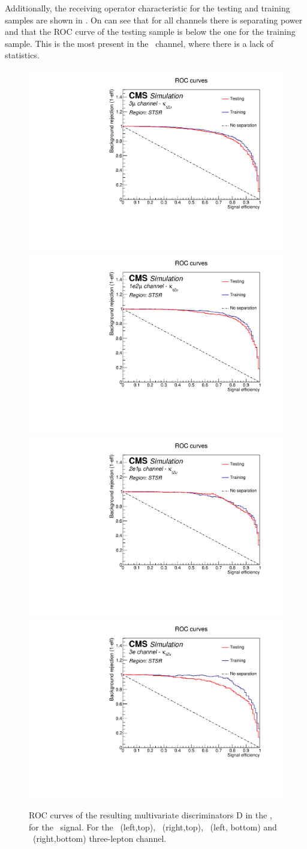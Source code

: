 Additionally, the receiving operator characteristic for the testing and training samples are shown in . On can see that for all channels there is separating power and that the ROC curve of the testing sample is below the one for the training sample. This is the most present in the \eee\ channel, where there is a lack of statistics. 
\begin{figure}[htbp]
	\centering
	\includegraphics[width=0.49\linewidth]{6_Search/Figures/PlotsTechnics/ROCZutsingletopuuu}
	\includegraphics[width=0.49\linewidth]{6_Search/Figures/PlotsTechnics/ROCZutsingletopuue}
	\includegraphics[width=0.49\linewidth]{6_Search/Figures/PlotsTechnics/ROCZutsingletopeeu}
	\includegraphics[width=0.49\linewidth]{6_Search/Figures/PlotsTechnics/ROCZutsingletopeee}
	\caption{ROC curves of the resulting  multivariate discriminators D in the \STSR, for the \Zut\ signal. For the \mumumu\ (left,top), \emumu\ (right,top), \eemu\ (left, bottom) and \eee\ (right,bottom) three-lepton channel.}
	\label{fig:roczutsingletop}
\end{figure}




